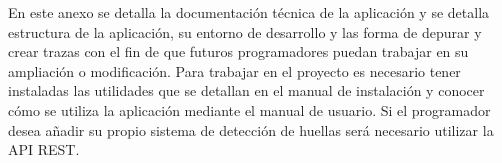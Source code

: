 En este anexo se detalla la documentación técnica de la aplicación y se detalla estructura de la aplicación, su entorno de desarrollo y las forma de depurar y crear trazas con el fin de que futuros programadores puedan trabajar en su ampliación o modificación.
Para trabajar en el proyecto es necesario tener instaladas las utilidades que se detallan en el manual de instalación y conocer cómo se utiliza la aplicación mediante el manual de usuario. Si el programador desea añadir su propio sistema de detección de huellas será necesario utilizar la API REST.
